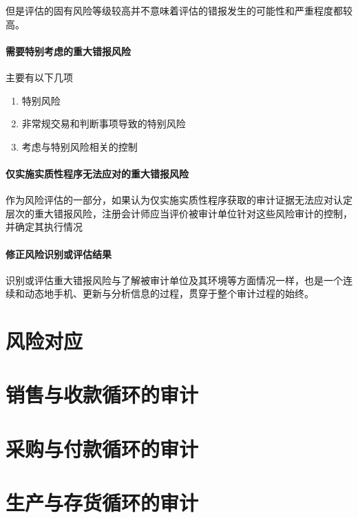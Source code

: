 \documentclass[UTF8,12pt]{ctexart}
\numberwithin{equation}{section} %
\numberwithin{figure}{section}
\numberwithin{table}{section}
\begin{document}
	但是评估的固有风险等级较高并不意味着评估的错报发生的可能性和严重程度都较高。
	
	\paragraph{需要特别考虑的重大错报风险}
	主要有以下几项
	\begin{enumerate}
		\item 特别风险
		
		\item 非常规交易和判断事项导致的特别风险
		
		\item 考虑与特别风险相关的控制
	\end{enumerate}
	
	
	
	\paragraph{仅实施实质性程序无法应对的重大错报风险}
	作为风险评估的一部分，如果认为仅实施实质性程序获取的审计证据无法应对认定层次的重大错报风险，注册会计师应当评价被审计单位针对这些风险审计的控制，并确定其执行情况
	
	\paragraph{修正风险识别或评估结果}
	识别或评估重大错报风险与了解被审计单位及其环境等方面情况一样，也是一个连续和动态地手机、更新与分析信息的过程，贯穿于整个审计过程的始终。
	
	\newpage
	\section{风险对应}
	
	\newpage
	\section{销售与收款循环的审计}
	
	\newpage
	\section{采购与付款循环的审计}
	
	\newpage
	\section{生产与存货循环的审计}
	
	\newpage
\end{document}
